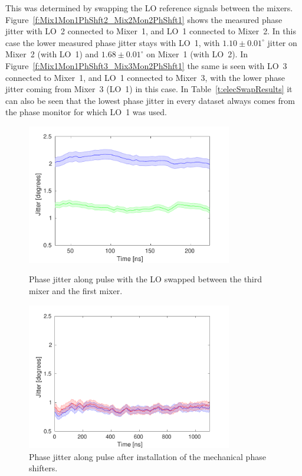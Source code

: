 This was determined by swapping the LO reference signals between the mixers. Figure~\ref{f:Mix1Mon1PhShft2_Mix2Mon2PhShft1} shows the measured phase jitter with LO~2 connected to Mixer~1, and LO~1 connected to Mixer~2. In this case the lower measured phase jitter stays with LO~1, with \(1.10\pm0.01^\circ\) jitter on Mixer~2 (with LO~1) and \(1.68\pm0.01^\circ\) on Mixer~1 (with LO~2). In Figure~\ref{f:Mix1Mon1PhShft3_Mix3Mon2PhShft1} the same is seen with LO~3 connected to Mixer~1, and LO~1 connected to Mixer~3, with the lower phase jitter coming from Mixer~3 (LO~1) in this case. In Table~\ref{t:elecSwapResults} it can also be seen that the lowest phase jitter in every dataset always comes from the phase monitor for which LO~1 was used.

\begin{figure}
  \centering
  \includegraphics[width=0.8\textwidth]{Figures/phaseMons/Mix1Mon1PhShft3_Mix3Mon2PhShft1}
  \caption{Phase jitter along pulse with the LO swapped between the third mixer and the first mixer.}
  \label{f:Mix1Mon1PhShft3_Mix3Mon2PhShft1}
  \includegraphics[width=0.8\textwidth]{Figures/phaseMons/jitterMechanicalShifters}
  \caption{Phase jitter along pulse after installation of the mechanical phase shifters.}
  \label{f:jitterMechanicalShifters}
\end{figure}

